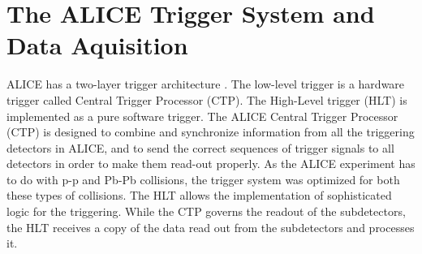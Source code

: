 \section{The ALICE Trigger System and Data Aquisition}
ALICE has a two-layer trigger architecture \cite{trigger-TDR}. The low-level trigger is a hardware trigger called Central Trigger Processor (CTP). The High-Level trigger (HLT) is implemented as a pure software trigger. 
The ALICE Central Trigger Processor (CTP) is designed to combine and synchronize information from all the triggering detectors in ALICE, and to send the correct sequences of trigger signals to all detectors in order to make them read-out properly. As the ALICE experiment has to do with p-p and Pb-Pb collisions, the trigger system was optimized for both these types of collisions. The HLT allows the implementation of sophisticated logic for the triggering. While the CTP governs the readout of the subdetectors, the HLT receives a copy of the data read out from the subdetectors and processes it.


